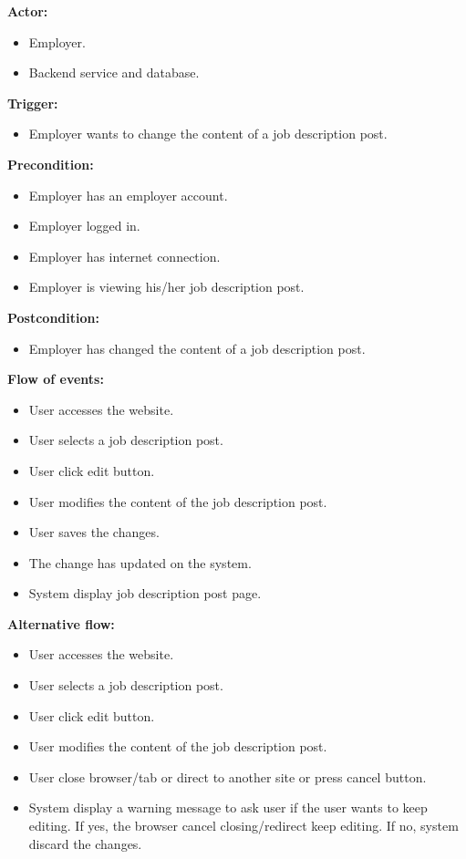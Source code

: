 \documentclass[a4paper]{article}
\begin{document}
\textbf{Actor:}
\begin{itemize}
  \item Employer.
  \item Backend service and database.
\end{itemize}

\textbf{Trigger:}
\begin{itemize}
  \item Employer wants to change the content of a job description post.
\end{itemize}

\textbf{Precondition:}
\begin{itemize}
  \item Employer has an employer account.
  \item Employer logged in.
  \item Employer has internet connection.
  \item Employer is viewing his/her job description post.
\end{itemize}

\textbf{Postcondition:}
\begin{itemize}
  \item Employer has changed the content of a job description post.
\end{itemize}

\textbf{Flow of events:}
\begin{itemize}
  \item User accesses the website.
  \item User selects a job description post.
  \item User click edit button.
  \item User modifies the content of the job description post.
  \item User saves the changes.
  \item The change has updated on the system.
  \item System display job description post page.
\end{itemize}

\textbf{Alternative flow:}
\begin{itemize}
  \item User accesses the website.
  \item User selects a job description post.
  \item User click edit button.
  \item User modifies the content of the job description post.
  \item User close browser/tab or direct to another site or press cancel button.
  \item System display a warning message to ask user if the user wants to keep editing. If yes, the browser cancel closing/redirect keep editing. If no, system discard the changes.
\end{itemize}
\end{document}
